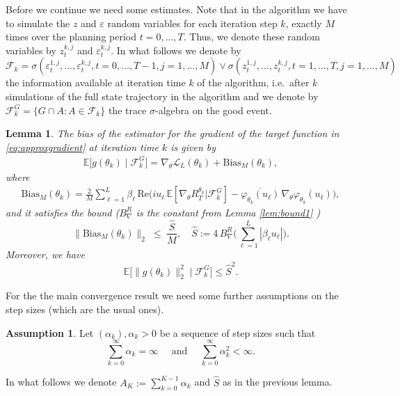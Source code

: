 \documentclass[reqno, 11pt]{amsart}%
\newcommand\cF{\mathcal F}
\newcommand\cL{\mathcal L}
\newcommand\EE{\mathbb E}
\newtheorem{lemma}[theorem]{Lemma}
\theoremstyle{definition}
\newtheorem{assumption}{Assumption}  %
\begin{document}
Before we continue we need some estimates. Note that in the algorithm we have to simulate the $z$ and $\varepsilon$ random variables for each iteration step $k$, exactly $M$ times over the planning period $t=0,\ldots,T.$ Thus, we denote these random variables by $z_t^{k,j}$ and $\varepsilon_t^{k,j}$. In what follows we denote by $\cF_k = \sigma(\varepsilon_t^{1,j},\ldots,\varepsilon_t^{k,j},t=0,\ldots, T-1, j=1,\ldots,M) \vee \sigma(z_t^{1,j},\ldots ,z_t^{k,j}, t=1,\ldots,T, j=1,\ldots,M)$ the information available at iteration time $k$ of the algorithm, i.e.\ after $k$ simulations of the full state trajectory in the algorithm  and we denote by $\cF_k^G =\{ G\cap A: A\in \cF_k\}$ the trace $\sigma$-algebra on the good event.

\begin{lemma}\label{lem:bias}
    The bias of the estimator for the gradient of the target function in \eqref{eq:approxgradient} at iteration time $k$ is given by
\begin{align}
\label{eq:bias-decomposition}
\EE\!\big[g(\theta_k)\mid \cF_k^G\big]
=
\nabla_\theta \cL_{L}(\theta_k)
+\mathrm{Bias}_M(\theta_k),
\end{align}
where
\begin{align}
\label{eq:bias-term}
\mathrm{Bias}_M(\theta_k)
=
\frac{2}{M}\sum_{\ell=1}^{L}\beta_\ell\,
\text{Re}\Big(
iu_\ell\,\EE[\nabla_\theta R_T^{\theta_k}|\cF_k^G]
-\overline{\varphi_{\theta_k}(u_\ell)}\,\nabla_\theta \varphi_{\theta_k}(u_\ell)
\Big),
\end{align}
and it satisfies the bound ($B_\nabla^R$ is the constant from Lemma \ref{lem:bound1} )
\begin{equation}
\label{eq:bias-bound}
\big\|\mathrm{Bias}_M(\theta_k)\big\|_2
\;\le\;
\frac{\hat{S}}{M} , \quad \hat{S}:=4\,B_\nabla^R\Big(\sum_{\ell=1}^{L}|\beta_\ell u_\ell|\Big).
\end{equation}
Moreover, we have
\begin{equation}
\label{eq:square-bound} \EE\!\big[ \|g(\theta_k)\|_2^2\mid \cF_k^G\big]\le \hat{S}^2.%
\end{equation}
\end{lemma}

For the the main convergence result we need some further assumptions on the step sizes (which are the usual ones). 

\begin{assumption} \label{ass:ConvAlgo}
 Let $(\alpha_k), \alpha_k> 0$ be a sequence of step sizes such that $$\sum_{k=0}^\infty \alpha_k = \infty\quad \mbox{ and } \quad \sum_{k=0}^\infty \alpha_k^2 <\infty. $$
\end{assumption}
In what follows we denote $A_K := \sum_{k=0}^{K-1} \alpha_k$ and $\hat{S}$ as in the previous lemma.
\end{document}
